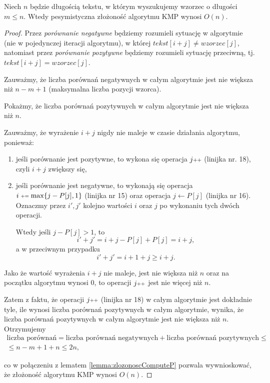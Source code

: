 \begin{theorem}
	Niech $n$ będzie długością tekstu, w którym wyszukujemy wzorzec o długości $m \leq n$. Wtedy pesymistyczna złożoność algorytmu KMP wynosi $O(n)$.
	\begin{proof}
		Przez \textit{porównanie negatywne} będziemy rozumieli sytuację w algorytmie
		(nie w pojedynczej iteracji algorytmu), w której
		$tekst[i + j] \not = wzorzec[j]$, natomiast przez \textit{porównanie pozytywne}
		będziemy rozumieli sytuację przeciwną, tj. $tekst[i + j] = wzorzec[j]$. %
		
		Zauważmy, że liczba porównań negatywnych w całym algorytmie jest 
		nie większa niż $n - m + 1$
		(maksymalna liczba pozycji wzorca).
		
		Pokażmy, że liczba porównań pozytywnych w całym algorytmie jest nie większa niż $n$.
		
		Zauważmy, że wyrażenie $i + j$ nigdy nie maleje w czasie działania algorytmu, ponieważ:
		\begin{enumerate}
			\item jeśli porównanie jest pozytywne, to wykona się 
			operacja $j\scalebox{0.75}{++}$ (linijka nr. 18), czyli $i + j$ zwiększy się, 
			\item jeśli porównanie jest negatywne, to wykonają się 
			operacja $i \pleq \max\{j - P[j], 1\}$ (linijka nr 15) oraz
			operacja $j \gets P[j]$ (linijka nr 16). Oznaczmy przez $i', j'$ kolejno wartości $i$
			oraz $j$ po wykonaniu tych dwóch operacji.
			
			Wtedy jeśli $j - P[j] > 1$, to 
			\[ i' + j' = i + j - P[j] + P[j] = i + j,\]
			a w przeciwnym przypadku
			\[ i' + j' = i + 1 + j \geq i + j.\]
		\end{enumerate}
		
		Jako że wartość wyrażenia $i + j$ nie maleje, jest nie większa niż $n$ oraz
		na początku algorytmu wynosi 0, to operacji $j\scalebox{0.75}{++}$
		jest nie więcej niż $n$.
		
		Zatem z faktu, że operacji $j\scalebox{0.75}{++}$ (linijka nr 18) w całym algorytmie jest 
		dokładnie tyle, ile wynosi liczba porównań pozytywnych w całym algorytmie, wynika, że
		liczba porównań pozytywnych w całym algorytmie jest nie większa niż $n$. Otrzymujemy
		\begin{gather*}
			\text{liczba porównań} = \text{liczba porównań negatywnych} + \text{liczba porównań pozytywnych}\leq  \\
			\leq n - m + 1 + n \leq 2n,
		\end{gather*}
	
		co w połączeniu z lematem \ref{lemma:zlozonoscComputeP} pozwala wywnioskować, że
		złożoność algorytmu KMP wynosi $O(n)$. \qedhere
		
		
	\end{proof}	
\end{theorem}

